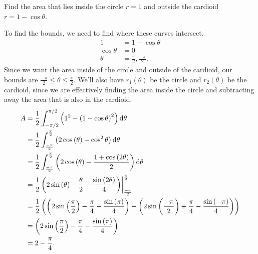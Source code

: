 \begin{example}
	Find the area that lies inside the circle $r=1$ and outside the cardioid $r=1-\cos{\theta}$.
\end{example}
To find the bounds, we need to find where these curves intersect.
\begin{align*}
	1 &= 1-\cos{\theta} \\
	\cos{\theta} &= 0 \\
	\theta &= \frac{\pi}{2}, \frac{-\pi}{2}.
\end{align*}
\indent
Since we want the area inside of the circle and outside of the cardioid, our bounds are $\frac{-\pi}{2} \leq \theta \leq \frac{\pi}{2}$.
We'll also have $r_1(\theta)$ be the circle and $r_2(\theta)$ be the cardioid, since we are effectively finding the area inside the circle and subtracting away the area that is also in the cardioid.
\begin{align*}
	A &= \frac{1}{2}\int_{-\pi/2}^{\pi/2}{\left(1^2 - \left(1-\cos{\theta}\right)^2\right)\mathrm{d} \theta} \\
	&= \frac{1}{2}\int_{\frac{-\pi}{2}}^{\frac{\pi}{2}}\left(2\cos\left(\theta\right)-\cos^{2}\theta\right)\mathrm{d} \theta \\
	&= \frac{1}{2}\int_{\frac{-\pi}{2}}^{\frac{\pi}{2}}\left(2\cos\left(\theta\right)-\frac{1+\cos\left(2\theta\right)}{2}\right)\mathrm{d} \theta \\
	&= \frac{1}{2}\left(2\sin\left(\theta\right)-\frac{\theta}{2}-\frac{\sin\left(2\theta\right)}{4}\right) \biggr\rvert_{\frac{-\pi}{2}}^{\frac{\pi}{2}} \\
	&= \frac{1}{2}\left(\left(2\sin\left(\frac{\pi}{2}\right)-\frac{\pi}{4}-\frac{\sin\left(\pi\right)}{4}\right)-\left(2\sin\left(\frac{-\pi}{2}\right)+\frac{\pi}{4}-\frac{\sin\left(-\pi\right)}{4}\right)\right) \\
	&= \left(2\sin\left(\frac{\pi}{2}\right)-\frac{\pi}{4}-\frac{\sin\left(\pi\right)}{4}\right) \\
	&= 2-\frac{\pi}{4}.
\end{align*}

